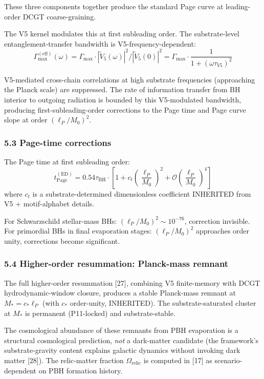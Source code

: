 \documentclass[
  11pt,
  a4paperpaper,
]{article}
\begin{document}
These three components together produce the standard Page curve at
leading-order DCGT coarse-graining.

The V5 kernel modulates this at first subleading order. The
substrate-level entanglement-transfer bandwidth is
V5-frequency-dependent:
\[\Gamma_{\mathrm{max}}^{(\mathrm{eff})}(\omega) = \Gamma_{\mathrm{max}} \cdot |\tilde V_5(\omega)|^2 / |\tilde V_5(0)|^2 = \Gamma_{\mathrm{max}} \cdot \frac{1}{1 + (\omega\tau_{V5})^2}\]

V5-mediated cross-chain correlations at high substrate frequencies
(approaching the Planck scale) are suppressed. The rate of information
transfer from BH interior to outgoing radiation is bounded by this
V5-modulated bandwidth, producing first-subleading-order corrections to
the Page time and Page curve slope at order \((\ell_P/M_0)^2\).

\subsubsection{5.3 Page-time corrections}\label{page-time-corrections}

The Page time at first subleading order:
\[t_{\mathrm{Page}}^{(\mathrm{ED})} = 0.54 \tau_{\mathrm{BH}} \cdot \left[1 + c_t \left(\frac{\ell_P}{M_0}\right)^2 + \mathcal{O}\left(\frac{\ell_P}{M_0}\right)^4\right]\]
where \(c_t\) is a substrate-determined dimensionless coefficient
INHERITED from V5 + motif-alphabet details.

For Schwarzschild stellar-mass BHs: \((\ell_P/M_0)^2 \sim 10^{-76}\),
correction invisible. For primordial BHs in final evaporation stages:
\((\ell_P/M_0)^2\) approaches order unity, corrections become
significant.

\subsubsection{5.4 Higher-order resummation: Planck-mass
remnant}\label{higher-order-resummation-planck-mass-remnant}

The full higher-order resummation {[}27{]}, combining V5 finite-memory
with DCGT hydrodynamic-window closure, produces a stable Planck-mass
remnant at \(M_* = c_*\ell_P\) (with \(c_*\) order-unity, INHERITED).
The substrate-saturated cluster at \(M_*\) is permanent (P11-locked) and
substrate-stable.

The cosmological abundance of these remnants from PBH evaporation is a
structural cosmological prediction, \emph{not} a dark-matter candidate
(the framework's substrate-gravity content explains galactic dynamics
without invoking dark matter {[}28{]}). The relic-matter fraction
\(\Omega_{\mathrm{relic}}\) is computed in {[}17{]} as
scenario-dependent on PBH formation history.
\end{document}
